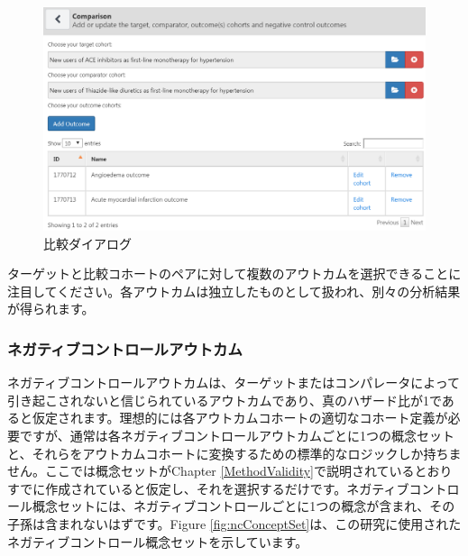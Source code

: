 \documentclass[
  11pt]{book}
\theoremstyle{definition}
\theoremstyle{definition}
\theoremstyle{definition}
\theoremstyle{definition}
\theoremstyle{remark}
\begin{document}
\begin{figure}

{\centering \includegraphics[width=1\linewidth]{images/PopulationLevelEstimation/comparisons} 

}

\caption{比較ダイアログ}\label{fig:comparisons}
\end{figure}

ターゲットと比較コホートのペアに対して複数のアウトカムを選択できることに注目してください。各アウトカムは独立したものとして扱われ、別々の分析結果が得られます。

\subsubsection*{ネガティブコントロールアウトカム}\label{ux30cdux30acux30c6ux30a3ux30d6ux30b3ux30f3ux30c8ux30edux30fcux30ebux30a2ux30a6ux30c8ux30abux30e0}

ネガティブコントロールアウトカムは、ターゲットまたはコンパレータによって引き起こされないと信じられているアウトカムであり、真のハザード比が1であると仮定されます。理想的には各アウトカムコホートの適切なコホート定義が必要ですが、通常は各ネガティブコントロールアウトカムごとに1つの概念セットと、それらをアウトカムコホートに変換するための標準的なロジックしか持ちません。ここでは概念セットがChapter \ref{MethodValidity}で説明されているとおりすでに作成されていると仮定し、それを選択するだけです。ネガティブコントロール概念セットには、ネガティブコントロールごとに1つの概念が含まれ、その子孫は含まれないはずです。Figure \ref{fig:ncConceptSet}は、この研究に使用されたネガティブコントロール概念セットを示しています。
\end{document}
